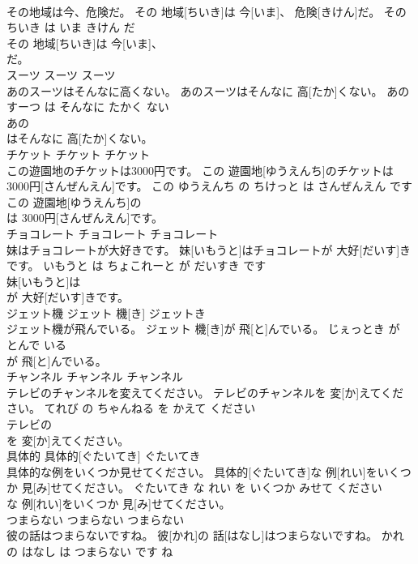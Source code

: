\documentclass[8pt]{extreport}
\begin{document}
\begin{CJK}{UTF8}{min}
\\	その地域は今、危険だ。	その 地域[ちいき]は 今[いま]、 危険[きけん]だ。	その ちいき は いま きけん だ	
\\	その 地域[ちいき]は 今[いま]、
\\	だ。			
\\	スーツ	スーツ	スーツ	
\\	あのスーツはそんなに高くない。	あのスーツはそんなに 高[たか]くない。	あの すーつ は そんなに たかく ない	
\\	あの
\\	はそんなに 高[たか]くない。			
\\	チケット	チケット	チケット	
\\	この遊園地のチケットは3000円です。	この 遊園地[ゆうえんち]のチケットは 3000円[さんぜんえん]です。	この ゆうえんち の ちけっと は さんぜんえん です	
\\	この 遊園地[ゆうえんち]の
\\	は 3000円[さんぜんえん]です。			
\\	チョコレート	チョコレート	チョコレート	
\\	妹はチョコレートが大好きです。	妹[いもうと]はチョコレートが 大好[だいす]きです。	いもうと は ちょこれーと が だいすき です	
\\	妹[いもうと]は
\\	が 大好[だいす]きです。			
\\	ジェット機	ジェット 機[き]	ジェットき	
\\	ジェット機が飛んでいる。	ジェット 機[き]が 飛[と]んでいる。	じぇっとき が とんで いる	
\\	が 飛[と]んでいる。			
\\	チャンネル	チャンネル	チャンネル	
\\	テレビのチャンネルを変えてください。	テレビのチャンネルを 変[か]えてください。	てれび の ちゃんねる を かえて ください	
\\	テレビの
\\	を 変[か]えてください。			
\\	具体的	具体的[ぐたいてき]	ぐたいてき	
\\	具体的な例をいくつか見せてください。	具体的[ぐたいてき]な 例[れい]をいくつか 見[み]せてください。	ぐたいてき な れい を いくつか みせて ください	
\\	な 例[れい]をいくつか 見[み]せてください。			
\\	つまらない	つまらない	つまらない	
\\	彼の話はつまらないですね。	彼[かれ]の 話[はなし]はつまらないですね。	かれ の はなし は つまらない です ね	

\end{CJK}
\end{document}
